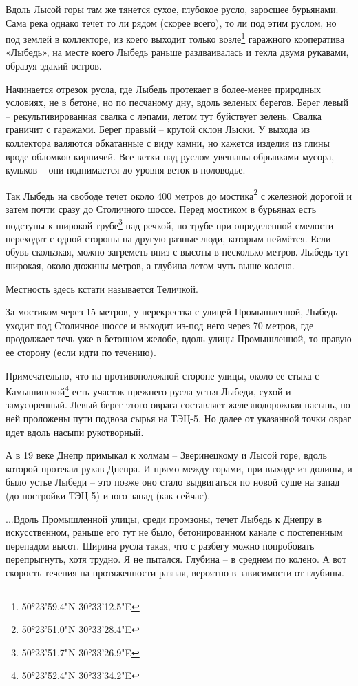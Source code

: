 Вдоль Лысой горы там же тянется сухое, глубокое русло, заросшее бурьянами. Сама река однако течет то ли рядом (скорее всего), то ли под этим руслом, но под землей в коллекторе, из коего выходит только возле\footnote{50°23'59.4"N 30°33'12.5"E} гаражного кооператива «Лыбедь», на месте коего Лыбедь раньше раздваивалась и текла двумя рукавами, образуя эдакий остров.

Начинается отрезок русла, где Лыбедь протекает в более-менее природных условиях, не в бетоне, но по песчаному дну, вдоль зеленых берегов. Берег левый – рекультивированная свалка с лэпами, летом тут буйствует зелень. Свалка граничит с гаражами. Берег правый – крутой склон Лыски. У выхода из коллектора валяются обкатанные с виду камни, но кажется изделия из глины вроде обломков кирпичей. Все ветки над руслом увешаны обрывками мусора, кульков – они поднимается до уровня веток в половодье.

Так Лыбедь на свободе течет около 400 метров до мостика\footnote{50°23'51.0"N 30°33'28.4"E} с железной дорогой и затем почти сразу до Столичного шоссе. Перед мостиком в бурьянах есть подступы к широкой трубе\footnote{50°23'51.7"N 30°33'26.9"E} над речкой, по трубе при определенной смелости переходят с одной стороны на другую разные люди, которым неймётся. Если обувь скользкая, можно загреметь вниз с высоты в несколько метров. Лыбедь тут широкая, около дюжины метров, а глубина летом чуть выше колена. 

Местность здесь кстати называется Теличкой.

За мостиком через 15 метров, у перекрестка с улицей Промышленной, Лыбедь уходит под Столичное шоссе и выходит из-под него через 70 метров, где продолжает течь уже в бетонном желобе, вдоль улицы Промышленной, то правую ее сторону (если идти по течению).

Примечательно, что на противоположной стороне улицы, около ее стыка с Камышинской\footnote{50°23'52.4"N 30°33'34.2"E} есть участок прежнего русла устья Лыбеди, сухой и замусоренный. Левый берег этого оврага составляет железнодорожная насыпь, по ней проложены пути подвоза сырья на ТЭЦ-5. Но далее от указанной точки овраг идет вдоль насыпи рукотворный.

А в 19 веке Днепр примыкал к холмам – Зверинецкому и Лысой горе, вдоль которой протекал рукав Днепра. И прямо между горами, при выходе из долины, и было устье Лыбеди – это позже оно стало выдвигаться по новой суше на запад (до постройки ТЭЦ-5) и юго-запад (как сейчас).

...Вдоль Промышленной улицы, среди промзоны, течет Лыбедь к Днепру в искусственном, раньше его тут не было, бетонированном канале с постепенным перепадом высот. Ширина русла такая, что с разбегу можно попробовать перепрыгнуть, хотя трудно. Я не пытался. Глубина – в среднем по колено. А вот скорость течения на протяженности разная, вероятно в зависимости от глубины.

